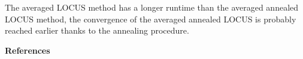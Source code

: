\documentclass[final]{beamer}
\begin{document}
\begin{multicols*}{3}
The averaged LOCUS method has a longer runtime than the averaged annealed LOCUS method, the convergence of the averaged annealed LOCUS is probably reached earlier thanks to the annealing procedure.

\vspace{1em}

\textbf{\large References}

\vspace{1em}


\end{multicols*}
\end{document}
